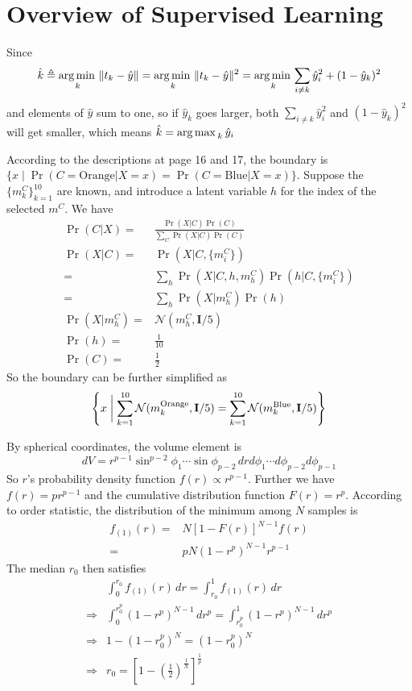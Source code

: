 \section{Overview of Supervised Learning}

\begin{sol}
Since
\[
\hat{k}\triangleq\operatorname*{arg\,min\,}_k\|t_k-\hat{y}\|=\operatorname*{arg\,min\,}_k\|t_k-\hat{y}\|^2=\operatorname*{arg\,min\,}_k\sum_{i\ne k}\hat{y}_i^2+(1-\hat{y}_k)^2
\]
and elements of $\hat{y}$ sum to one, so if $\hat{y}_k$ goes larger, both $\sum_{i\ne k}\hat{y}_i^2$ and $(1-\hat{y}_k)^2$ will get smaller, which means $\hat{k}=\operatorname*{arg\,max\,}_k\hat{y}_i$ 
\end{sol}

\begin{sol}
According to the descriptions at page 16 and 17, the boundary is $\{x\mid \Pr(C=\mathrm{Orange}\vert X=x) =\Pr(C=\mathrm{Blue}\vert X=x)\}$. Suppose the $\{m_k^C\}_{k=1}^{10}$ are known, and introduce a latent variable $h$ for the index of the selected $m^C$. We have
\begin{align*}
\Pr(C\vert X) =& \frac{\Pr(X\vert C)\Pr(C)}{\sum_C\Pr(X\vert C)\Pr(C)}\\
\Pr(X\vert C) =& \Pr(X\vert C,\{m_i^C\})\\
=& \sum_h\Pr(X\vert C,h,m_h^C)\Pr(h\vert C,\{m_i^C\})\\
=& \sum_h\Pr(X\vert m_h^C)\Pr(h)\\
\Pr(X\vert m_h^C) =& \mathcal{N}(m_h^C,\mathbf{I}/5)\\
\Pr(h) =& \frac{1}{10}\\
\Pr(C) =& \frac{1}{2}
\end{align*}
So the boundary can be further simplified as
\[
\left\{x\biggm| \sum_{k=1}^{10} \mathcal{N}(m_k^\mathrm{Orange},\mathbf{I}/5)=\sum_{k=1}^{10} \mathcal{N}(m_k^\mathrm{Blue},\mathbf{I}/5)\right\}
\]
\end{sol}

\begin{sol}
By spherical coordinates, the volume element is \[
dV=r^{p-1}\sin^{p-2}\phi_1\cdots\sin\phi_{p-2}\,drd\phi_1\cdots d\phi_{p-2}d\phi_{p-1}
\]
So $r$'s probability density function $f(r)\propto r^{p-1}$. Further we have $f(r)=pr^{p-1}$ and the cumulative distribution function $F(r)=r^p$. According to order statistic, the distribution of the minimum among $N$ samples is
\begin{align*}
f_{(1)}(r) =& N\left[1-F(r)\right]^{N-1}f(r)\\
=& pN\left(1-r^p\right)^{N-1}r^{p-1}
\end{align*}
The median $r_0$ then satisfies
\begin{align*}
& \int_0^{r_0}f_{(1)}(r)\,dr=\int_{r_0}^1f_{(1)}(r)\,dr \\
\Longrightarrow & \int_0^{r_0^p}\left(1-r^p\right)^{N-1}\,dr^p=\int_{r_0^p}^1\left(1-r^p\right)^{N-1}\,dr^p \\
\Longrightarrow & 1-\left(1-r_0^p\right)^N=\left(1-r_0^p\right)^N \\
\Longrightarrow & r_0=\left[1-\left(\frac{1}{2}\right)^{\frac{1}{N}}\right]^{\frac{1}{p}}
\end{align*}
\end{sol}

